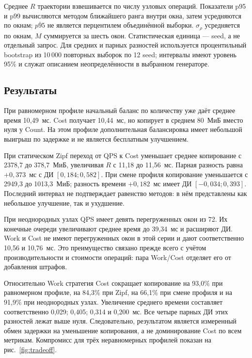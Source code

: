 \documentclass{misisarticle}
\begin{document}
Среднее $R$ траектории взвешивается по числу узловых операций. Показатели p95 и p99 вычисляются методом ближайшего ранга внутри окна, затем усредняются по окнам; $\overline{p95}$ не является перцентилем объединённой выборки. $\sigma_\rho$ усредняется по окнам, $M$ суммируется за шесть окон. Статистическая единица --- seed, а не отдельный запрос. Для средних и парных разностей используется процентильный bootstrap из 10\,000 повторных выборок по 12 seed; интервалы имеют уровень 95\% и служат описанием неопределённости в выбранном генераторе.



\subsection{Результаты}
При равномерном профиле начальный баланс по количеству уже даёт среднее время 10,49~мс. Cost получает 10,44~мс, но копирует в среднем 80~МиБ вместо нуля у Count. На этом профиле дополнительная балансировка имеет небольшой выигрыш по задержке и не является бесплатным улучшением.

При статическом Zipf переход от QPS к Cost уменьшает среднее копирование с 2378,7 до 378,7~МиБ, увеличивая $R$ с 11,18 до 11,56~мс. Парная разность равна $+0{,}373$~мс с ДИ $[0{,}184;0{,}582]$. При смене профиля копирование уменьшается с 2949,3 до 1013,3~МиБ; разность времени $+0{,}182$~мс имеет ДИ $[-0{,}034;0{,}393]$. Последний интервал не подтверждает равенство методов: в нём представлены как небольшое улучшение, так и ухудшение.

При неоднородных узлах QPS имеет девять перегруженных окон из 72. Их конечные очереди увеличивают среднее время до 39,34~мс и расширяют ДИ. Work и Cost не имеют перегруженных окон в этой серии и дают соответственно 10,56 и 10,76~мс. Это преимущество связано прежде всего с учётом производительности и стоимости операций: пара Work/Cost отделяет его от добавления штрафов.

Относительно Work стратегия Cost сокращает копирование на 93,0\% при равномерном профиле, на 84,3\% при Zipf, на 66,1\% при смене профиля и на 91,9\% при неоднородных узлах. Увеличение среднего времени составляет соответственно 0,029; 0,405; 0,314 и 0,200~мс. Все четыре парных ДИ этих разностей лежат выше нуля. Следовательно, результатом является измеренный обмен задержки на уменьшение копирования, а не доминирование Cost по всем метрикам. Компромисс для трёх неравномерных профилей показан на рис.~\ref{fig:tradeoff}.
\end{document}
